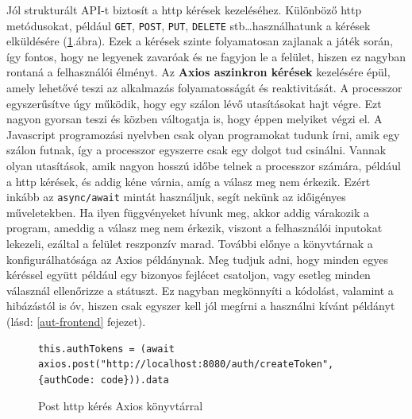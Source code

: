 \documentclass[a4paper,twoside]{article}
\begin{document}
Jól strukturált API-t biztosít a http kérések kezeléséhez. Különböző http metódusokat, például \verb|GET|, \verb|POST|,
\verb|PUT|, \verb|DELETE| stb\ldots használhatunk a kérések elküldésére (\ref{axios}.ábra). Ezek a kérések szinte folyamatosan zajlanak a játék során, így fontos, hogy ne legyenek zavaróak és ne fagyjon le a felület, hiszen ez nagyban rontaná a felhasználói élményt. Az \textbf{Axios aszinkron kérések} kezelésére épül, amely
lehetővé teszi az alkalmazás folyamatosságát és reaktivitását. A processzor egyszerűsítve úgy működik, hogy egy szálon lévő utasításokat hajt végre. Ezt nagyon gyorsan teszi és közben váltogatja is, hogy éppen melyiket végzi el. A Javascript programozási nyelvben csak olyan programokat tudunk írni, amik egy szálon futnak, így a processzor egyszerre csak egy dolgot tud csinálni. Vannak olyan utasítások, amik nagyon hosszú időbe telnek a processzor számára, például a http kérések, és addig kéne várnia, amíg a válasz meg nem érkezik. Ezért inkább az \verb|async/await| mintát használjuk, segít nekünk az időigényes műveletekben. Ha ilyen függvényeket hívunk meg, akkor addig várakozik a program, ameddig a válasz meg nem érkezik, viszont a felhasználói inputokat lekezeli, ezáltal a felület reszponzív marad.
További előnye a könyvtárnak a konfigurálhatósága az Axios példánynak. Meg tudjuk adni, hogy minden egyes kéréssel együtt például egy bizonyos fejlécet csatoljon, vagy esetleg minden válasznál ellenőrizze a státuszt. Ez nagyban megkönnyíti a kódolást, valamint a hibázástól is óv, hiszen csak egyszer kell jól megírni a használni kívánt példányt (lásd: \ref{aut-frontend} fejezet).	
\begin{figure}
	\caption{Post http kérés Axios könyvtárral}
	
		\begin{minipage}{\textwidth}
			\begin{lstlisting}[style=javascriptStyle]
					this.authTokens = (await axios.post("http://localhost:8080/auth/createToken", {authCode: code})).data
					\end{lstlisting}
				\end{minipage}
	
\label{axios}
\end{figure}
\end{document}
